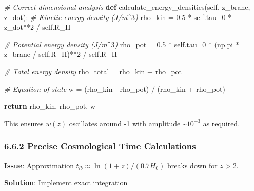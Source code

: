 \documentclass[
  11pt,
]{report}
\newenvironment{Shaded}{}{}
\newcommand{\CommentTok}[1]{\textcolor[rgb]{0.38,0.63,0.69}{\textit{#1}}}
\newcommand{\ControlFlowTok}[1]{\textcolor[rgb]{0.00,0.44,0.13}{\textbf{#1}}}
\newcommand{\DecValTok}[1]{\textcolor[rgb]{0.25,0.63,0.44}{#1}}
\newcommand{\FloatTok}[1]{\textcolor[rgb]{0.25,0.63,0.44}{#1}}
\newcommand{\KeywordTok}[1]{\textcolor[rgb]{0.00,0.44,0.13}{\textbf{#1}}}
\newcommand{\NormalTok}[1]{#1}
\newcommand{\OperatorTok}[1]{\textcolor[rgb]{0.40,0.40,0.40}{#1}}
\newcommand{\VariableTok}[1]{\textcolor[rgb]{0.10,0.09,0.49}{#1}}
\begin{document}
\begin{Shaded}
\begin{Highlighting}[]
\CommentTok{\# Correct dimensional analysis}
\KeywordTok{def}\NormalTok{ calculate\_energy\_densities(}\VariableTok{self}\NormalTok{, z\_brane, z\_dot):}
    \CommentTok{\# Kinetic energy density (J/m$\^{}3$)}
\NormalTok{    rho\_kin }\OperatorTok{=} \FloatTok{0.5} \OperatorTok{*} \VariableTok{self}\NormalTok{.tau\_0 }\OperatorTok{*}\NormalTok{ z\_dot}\OperatorTok{**}\DecValTok{2} \OperatorTok{/} \VariableTok{self}\NormalTok{.R\_H}
    
    \CommentTok{\# Potential energy density (J/m$\^{}3$) }
\NormalTok{    rho\_pot }\OperatorTok{=} \FloatTok{0.5} \OperatorTok{*} \VariableTok{self}\NormalTok{.tau\_0 }\OperatorTok{*}\NormalTok{ (np.pi }\OperatorTok{*}\NormalTok{ z\_brane }\OperatorTok{/} \VariableTok{self}\NormalTok{.R\_H)}\OperatorTok{**}\DecValTok{2} \OperatorTok{/} \VariableTok{self}\NormalTok{.R\_H}
    
    \CommentTok{\# Total energy density}
\NormalTok{    rho\_total }\OperatorTok{=}\NormalTok{ rho\_kin }\OperatorTok{+}\NormalTok{ rho\_pot}
    
    \CommentTok{\# Equation of state}
\NormalTok{    w }\OperatorTok{=}\NormalTok{ (rho\_kin }\OperatorTok{{-}}\NormalTok{ rho\_pot) }\OperatorTok{/}\NormalTok{ (rho\_kin }\OperatorTok{+}\NormalTok{ rho\_pot)}
    
    \ControlFlowTok{return}\NormalTok{ rho\_kin, rho\_pot, w}
\end{Highlighting}
\end{Shaded}

This ensures \(w(z)\) oscillates around -1 with amplitude
\textasciitilde{}\(10^{-3}\) as required.

\subsubsection{6.6.2 Precise Cosmological Time
Calculations}\label{precise-cosmological-time-calculations}

\textbf{Issue}: Approximation \(t_{lb} \approx \ln(1+z)/(0.7 H_0)\)
breaks down for \(z > 2\).

\textbf{Solution}: Implement exact integration
\end{document}

